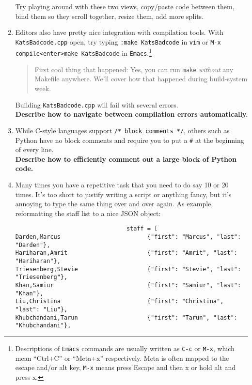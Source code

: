 \documentclass{article}
\begin{document}
\begin{enumerate}
    Try playing around with these two views, copy/paste code between them,
    bind them so they scroll together, resize them, add more splits.\\
    \newpage
  \item Editors also have pretty nice integration with compilation tools. With
    \texttt{KatsBadcode.cpp} open, try typing \texttt{:make KatsBadcode} in
    \texttt{vim} or \texttt{M-x compile<enter>make KatsBadcode} in
    \texttt{Emacs}.\footnote{
      Descriptions of \texttt{Emacs} commands are usually written as
      \texttt{C-c} or \texttt{M-x}, which mean ``Ctrl+C'' or ``Meta+x''
      respectively. Meta is often mapped to the escape and/or alt key,
      \texttt{M-x} means press Escape and then x or hold alt and press x.
    }
    \begin{quote}
      First cool thing that happened: Yes, you can run \texttt{make}
      \emph{without} any Makefile anywhere. We'll cover how that happened
      during build-system week.
    \end{quote}
    Building \texttt{KatsBadcode.cpp} will fail with several errors.\\
    \textbf{Describe how to navigate between compilation errors automatically.}
    \vspace{6em}
  \item While C-style languages support \texttt{/* block comments */}, others
    such as Python have no block comments and require you to put a \texttt{\#}
    at the beginning of every line.\\
    \textbf{Describe how to efficiently comment out a large block of Python code.}
    \vspace{6em}
  \item Many times you have a repetitive task that you need to do say 10 or 20
    times. It's too short to justify writing a script or anything fancy, but
    it's annoying to type the same thing over and over again. As example,
    reformatting the staff list to a nice JSON object:
    \begin{verbatim}                                staff = [
Darden,Marcus                         {"first": "Marcus", "last": "Darden"},
Hariharan,Amrit                       {"first": "Amrit", "last": "Hariharan"},
Triesenberg,Stevie                    {"first": "Stevie", "last": "Triesenberg"},
Khan,Samiur                           {"first": "Samiur", "last": "Khan"},
Liu,Christina                         {"first": "Christina", "last": "Liu"},
Khubchandani,Tarun                    {"first": "Tarun", "last": "Khubchandani"},

\end{verbatim}
\end{enumerate}
\end{document}
